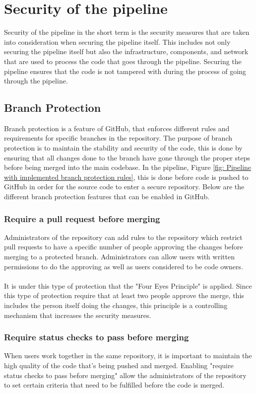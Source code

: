 \section{Security of the pipeline}
\label{Security of the pipeline}
Security of the pipeline in the short term is the security measures that are taken into consideration when securing the pipeline itself. This includes not only securing the pipeline itself but also the infrastructure, components, and network that are used to process the code that goes through the pipeline. Securing the pipeline ensures that the code is not tampered with during the process of going through the pipeline. 


\subsection{Branch Protection}
\label{branchprotection}
Branch protection is a feature of GitHub, that enforces different rules and requirements for specific branches in the repository. The purpose of branch protection is to maintain the stability and security of the code, this is done by ensuring that all changes done to the branch have gone through the proper steps before being merged into the main codebase. In the pipeline, Figure \ref{fig: Pipeline with implemented branch protection rules}, this is done before code is pushed to GitHub in order for the source code to enter a secure repository. Below are the different branch protection features that can be enabled in GitHub. \cite{ProtectedBranches}

\subsubsection{Require a pull request before merging}
Administrators of the repository can add rules to the repository which restrict pull requests to have a specific number of people approving the changes before merging to a protected branch. Administrators can allow users with written permissions to do the approving as well as users considered to be code owners. 
\\~\\
It is under this type of protection that the "Four Eyes Principle" is applied. Since this type of protection require that at least two people approve the merge, this includes the person itself doing the changes, this principle is a controlling mechanism that increases the security measures. 

\subsubsection{Require status checks to pass before merging}
When users work together in the same repository, it is important to maintain the high quality of the code that's being pushed and merged. Enabling "require status checks to pass before merging" allow the administrators of the repository to set certain criteria that need to be fulfilled before the code is merged. 


